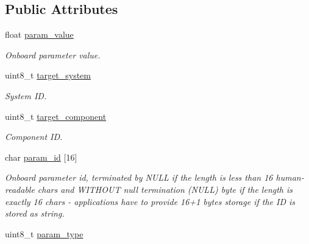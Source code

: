 \subsection*{Public Attributes}
\begin{DoxyCompactItemize}
\item 
\hypertarget{struct____mavlink__param__set__t_a210adccaf668137e5f083c825804276e}{float \hyperlink{struct____mavlink__param__set__t_a210adccaf668137e5f083c825804276e}{param\+\_\+value}}\label{struct____mavlink__param__set__t_a210adccaf668137e5f083c825804276e}

\begin{DoxyCompactList}\small\item\em Onboard parameter value. \end{DoxyCompactList}\item 
\hypertarget{struct____mavlink__param__set__t_a501eee1b0a93fa7affad440d51bbab90}{uint8\+\_\+t \hyperlink{struct____mavlink__param__set__t_a501eee1b0a93fa7affad440d51bbab90}{target\+\_\+system}}\label{struct____mavlink__param__set__t_a501eee1b0a93fa7affad440d51bbab90}

\begin{DoxyCompactList}\small\item\em System I\+D. \end{DoxyCompactList}\item 
\hypertarget{struct____mavlink__param__set__t_ad1526f09aefc29226f2362a2a0963237}{uint8\+\_\+t \hyperlink{struct____mavlink__param__set__t_ad1526f09aefc29226f2362a2a0963237}{target\+\_\+component}}\label{struct____mavlink__param__set__t_ad1526f09aefc29226f2362a2a0963237}

\begin{DoxyCompactList}\small\item\em Component I\+D. \end{DoxyCompactList}\item 
\hypertarget{struct____mavlink__param__set__t_acd97fee9abc903096a392cb9b4b78369}{char \hyperlink{struct____mavlink__param__set__t_acd97fee9abc903096a392cb9b4b78369}{param\+\_\+id} \mbox{[}16\mbox{]}}\label{struct____mavlink__param__set__t_acd97fee9abc903096a392cb9b4b78369}

\begin{DoxyCompactList}\small\item\em Onboard parameter id, terminated by N\+U\+L\+L if the length is less than 16 human-\/readable chars and W\+I\+T\+H\+O\+U\+T null termination (N\+U\+L\+L) byte if the length is exactly 16 chars -\/ applications have to provide 16+1 bytes storage if the I\+D is stored as string. \end{DoxyCompactList}\item 
\hypertarget{struct____mavlink__param__set__t_a4eb99cce0725481254d653290a06de6f}{uint8\+\_\+t \hyperlink{struct____mavlink__param__set__t_a4eb99cce0725481254d653290a06de6f}{param\+\_\+type}}\label{struct____mavlink__param__set__t_a4eb99cce0725481254d653290a06de6f}


\end{DoxyCompactItemize}
